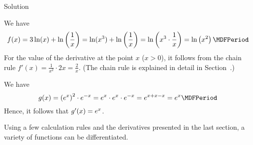 \begin{MExercises}
\begin{MExercise}
\begin{MHint}{Solution}
 \begin{MExerciseItems}
  \item We have
  \[
   f(x) = 3 \ln (x) + \ln \left( \frac1x \right) = \ln (x^3) + \ln \left( \frac1x \right) = \ln \left( x^3 \cdot \frac1x \right)
   = \ln \left( x^2 \right) \MDFPeriod
  \]
  For the value of the derivative at the point $x$ ($x>0$), it follows from the chain rule
  $f'(x) = \frac{1}{x^2} \cdot 2 x = \frac{2}{x}$. (The chain rule is explained in detail 
  in Section~.)
  \item We have
  \[
  g(x) = \left( \MEU^x \right)^2 \cdot \MEU^{-x} = \MEU^x \cdot \MEU^x \cdot \MEU^{-x} = \MEU^{x+x-x} = \MEU^x \MDFPeriod
  \]
  Hence, it follows that $g'(x) = e^x$.
 \end{MExerciseItems}
\end{MHint}
\end{MExercise}

\end{MExercises}




\begin{MIntro}
Using a few calculation rules and the derivatives presented in the last section, 
a variety of functions can be differentiated. 
\end{MIntro}

